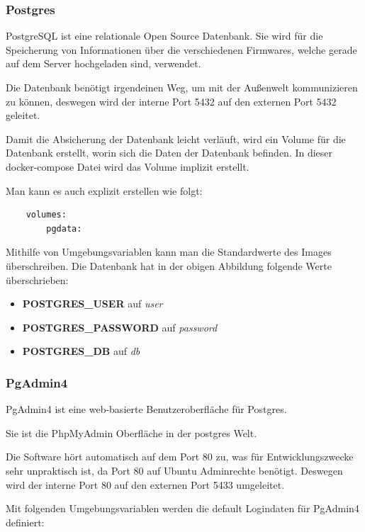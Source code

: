 \subsubsection{Postgres}

PostgreSQL ist eine relationale Open Source Datenbank. Sie wird für die Speicherung von Informationen über die verschiedenen Firmwares, welche gerade auf dem Server hochgeladen sind, verwendet.

Die Datenbank benötigt irgendeinen Weg, um mit der Außenwelt kommunizieren zu können, deswegen wird der interne Port 5432 auf den externen Port 5432 geleitet.

Damit die Absicherung der Datenbank leicht verläuft, wird ein Volume für die Datenbank erstellt, worin sich die Daten der Datenbank befinden. In dieser docker-compose Datei wird das Volume implizit erstellt. 

Man kann es auch explizit erstellen wie folgt:

\begin{verbatim}
    volumes:
        pgdata:
\end{verbatim}

Mithilfe von Umgebungsvariablen kann man die Standardwerte des Images überschreiben. Die Datenbank hat in der obigen Abbildung folgende Werte überschrieben:

\begin{itemize}
    \item \textbf{POSTGRES\_USER} auf \textit{user}
    \item \textbf{POSTGRES\_PASSWORD} auf \textit{password}
    \item \textbf{POSTGRES\_DB} auf \textit{db}
\end{itemize}

\subsubsection{PgAdmin4}

PgAdmin4 ist eine web-basierte Benutzeroberfläche für Postgres.

Sie ist die PhpMyAdmin Oberfläche in der postgres Welt.

Die Software hört automatisch auf dem Port 80 zu, was für Entwicklungszwecke sehr unpraktisch ist, da Port 80 auf Ubuntu Adminrechte benötigt. Deswegen wird der interne Port 80 auf den externen Port 5433 umgeleitet.

Mit folgenden Umgebungsvariablen werden die default Logindaten für PgAdmin4 definiert:

